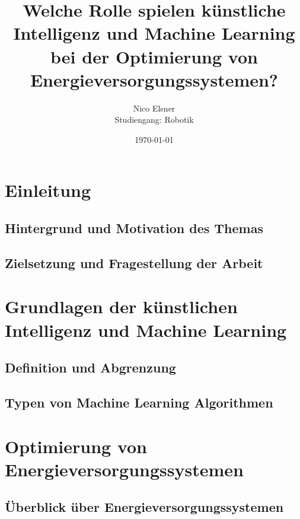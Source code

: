 \documentclass[
11pt, 
a4paper,
DIV = 14,
twoside,
twocolumn, %
parskip =half, %
headsepline, %
openright, %
]{scrreprt}
\begin{document}
	
	\title{Welche Rolle spielen künstliche Intelligenz und Machine Learning bei der Optimierung von Energieversorgungssystemen?}
	\author{Nico Elsner\\
		Studiengang: Robotik}
	\date{\today}
	\maketitle
	\tableofcontents
	\thispagestyle{empty}
	
	\chapter{Einleitung}
	\setcounter{page}{1}
	\blindtext
	\section{Hintergrund und Motivation des Themas}
	\blindtext
	\section{Zielsetzung und Fragestellung der Arbeit}
	\blindtext


	\chapter{Grundlagen der künstlichen Intelligenz und Machine Learning}
	\blindtext
	\section{Definition und Abgrenzung}
	\blindtext
	\section{Typen von Machine Learning Algorithmen}
	\blindtext


	\chapter{Optimierung von Energieversorgungssystemen}
	\blindtext
	\section{Überblick über Energieversorgungssystemen}
	\blindtext
\end{document}

